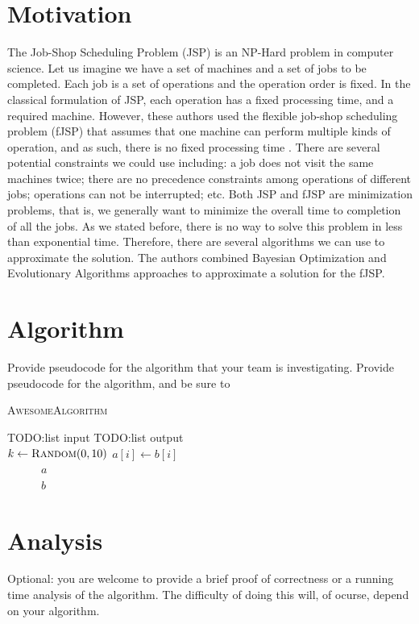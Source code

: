 \documentclass[11pt]{article}
\begin{document}
\section{Motivation}
The Job-Shop Scheduling Problem (JSP) is an NP-Hard problem in computer science\cite{cheng1996tutorial}. Let us imagine we have a set of machines and a set of jobs to be completed. Each job is a set of operations and the operation order is fixed. In the classical formulation of JSP, each operation has a fixed processing time, and a required machine. However, these authors used the flexible job-shop scheduling problem (fJSP) that assumes that one machine can perform multiple kinds of operation, and as such, there is no fixed processing time \cite{sun2015bayesian}. There are several potential constraints we could use including: a job does not visit the same machines twice; there are no precedence constraints among operations of different jobs; operations can not be interrupted; etc. Both JSP and fJSP are minimization problems, that is, we generally want to minimize the overall time to completion of all the jobs. As we stated before, there is no way to solve this problem in less than exponential time. Therefore, there are several algorithms we can use to approximate the solution. The authors combined Bayesian Optimization and Evolutionary Algorithms approaches to approximate a solution for the fJSP. 

\section{Algorithm}
Provide pseudocode for the algorithm that your team is investigating.  Provide 
pseudocode for the algorithm, and be sure to 

\begin{algorithm}\caption{\textsc{AwesomeAlgorithm}}
 \begin{algorithmic}[1]
    TODO:list input
    TODO:list output\\
   
   \State $k \gets \textsc{Random}(0,10)$
	\State $a[i] \gets b[i]$
        \EndWhile\\
~~~~~~\Return $a$
   \Else\\
   ~~~~~~\Return $b$
   \EndIf
 \end{algorithmic}
\end{algorithm}

\section{Analysis}
Optional: you are welcome to provide a brief proof of correctness or a 
running time analysis of the algorithm.  The difficulty of doing this will, of 
ocurse, depend on your algorithm.
\end{document}
